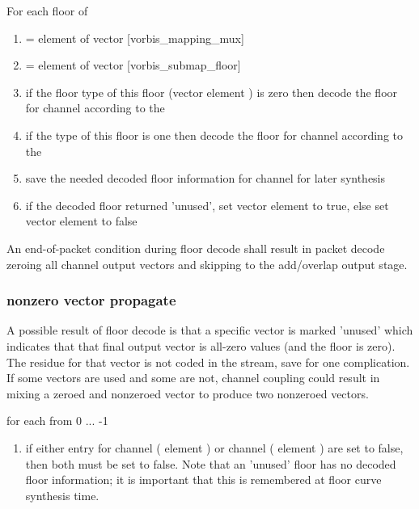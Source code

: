 For each floor \varname{[i]} of 
 \begin{enumerate}
  \item {} = element \varname{[i]} of vector [vorbis\_mapping\_mux]
  \item {} = element  of vector
[vorbis\_submap\_floor]
  \item if the floor type of this
floor (vector  element
) is zero then decode the floor for
channel \varname{[i]} according to the
  \item if the type of this floor
is one then decode the floor for channel \varname{[i]} according
to the 
  \item save the needed decoded floor information for channel for later synthesis
  \item if the decoded floor returned 'unused', set vector \varname{[no\_residue]} element
\varname{[i]} to true, else set vector \varname{[no\_residue]} element \varname{[i]} to
false
 \end{enumerate}


An end-of-packet condition during floor decode shall result in packet
decode zeroing all channel output vectors and skipping to the
add/overlap output stage.



\subsubsection{nonzero vector propagate}

A possible result of floor decode is that a specific vector is marked
'unused' which indicates that that final output vector is all-zero
values (and the floor is zero).  The residue for that vector is not
coded in the stream, save for one complication.  If some vectors are
used and some are not, channel coupling could result in mixing a
zeroed and nonzeroed vector to produce two nonzeroed vectors.

for each \varname{[i]} from 0 ... -1

\begin{enumerate}
 \item if either \varname{[no\_residue]} entry for channel
( element \varname{[i]})
or channel
( element \varname{[i]})
are set to false, then both must be set to false.  Note that an 'unused'
floor has no decoded floor information; it is important that this is
remembered at floor curve synthesis time.
\end{enumerate}




